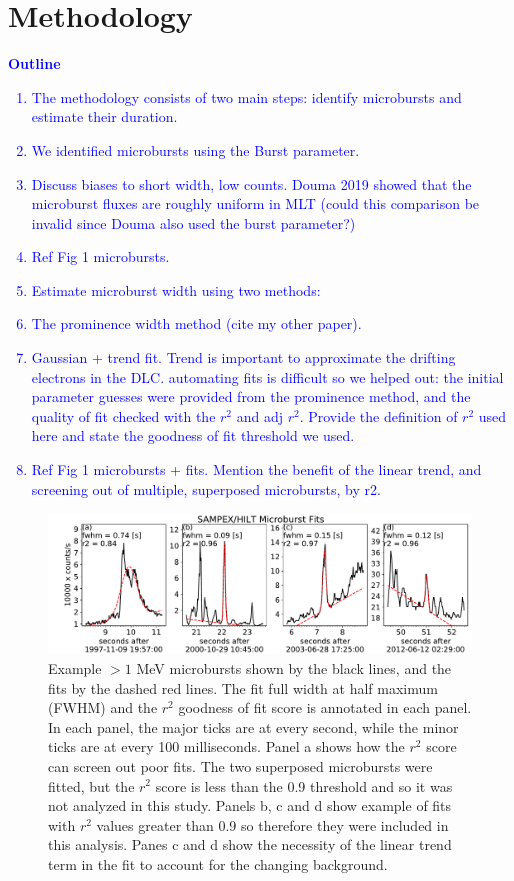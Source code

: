 \documentclass[draft]{agujournal2019}
\begin{document}
\section{Methodology}\label{methodology}
\textcolor{blue}{
\textbf{Outline}
\begin{enumerate}
    \item The methodology consists of two main steps: identify microbursts and estimate their duration.
    \item We identified microbursts using the Burst parameter.
    \item Discuss biases to short width, low counts. Douma 2019 showed that the microburst fluxes are roughly uniform in MLT (could this comparison be invalid since Douma also used the burst parameter?)
    \item Ref Fig 1 microbursts.
    \item Estimate microburst width using two methods:
    \item The prominence width method (cite my other paper).
    \item Gaussian + trend fit. Trend is important to approximate the drifting electrons in the DLC. automating fits is difficult so we helped out: the initial parameter guesses were provided from the prominence method, and the quality of fit checked with the $r^2$ and adj $r^2$. Provide the definition of $r^2$ used here and state the goodness of fit threshold we used.  
    \item Ref Fig 1 microbursts + fits. Mention the benefit of the linear trend, and screening out of multiple, superposed microbursts, by r2.
\end{enumerate}
}

\begin{figure}
\noindent\includegraphics[width=\textwidth]{figures/fig1.pdf}
\caption{Example $>1$ MeV microbursts shown by the black lines, and the fits by the dashed red lines. The fit full width at half maximum (FWHM) and the $r^2$ goodness of fit score is annotated in each panel. In each panel, the major ticks are at every second, while the minor ticks are at every 100 milliseconds. Panel a shows how the $r^2$ score can screen out poor fits. The two superposed microbursts were fitted, but the $r^2$ score is less than the 0.9 threshold and so it was not analyzed in this study. Panels b, c and d show example of fits with $r^2$ values greater than 0.9 so therefore they were included in this analysis. Panes c and d show the necessity of the linear trend term in the fit to account for the changing background.}
\label{fig1}
\end{figure}
\end{document}
